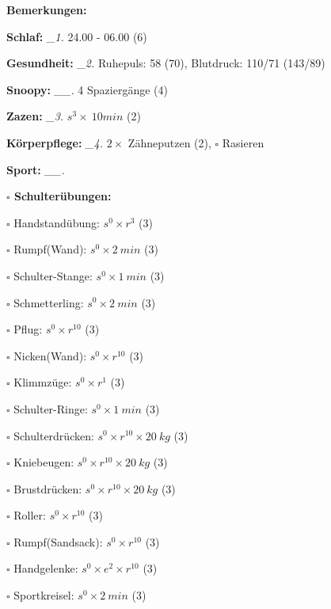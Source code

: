 \documentclass[10pt,a4paper]{article}
\newcommand\prop[1] {{\color {alizarin} {\bf #1}}}             %
\newcommand\mand[1] {{\color {burntorange} {\bf #1}}}          %
\newcommand\topspace{\vskip -15pt \hskip 20pt}
\newcommand\n[1] { {\sl #1.} \hskip 5pt }
\begin{document}
\begin{mdframed}[style=daystyle]
  \begin{labeling}{{\mand {Bemerkungen:}}}
    \setlength\itemsep{-3pt}
  \item[{\mand {Schlaf:}}]        \n{\_1} 24.00 - 06.00 (6)
  \item[{\mand {Gesundheit:}}]    \n{\_2} Ruhepuls: 58 (70), Blutdruck: 110/71 (143/89)
  \item[{\mand {Snoopy:}}]       \n{\_\_} 4 Spaziergänge (4) 
  \item[{\mand {Zazen:}}]         \n{\_3} $s^3 \times\ 10 min$ (2)
  \item[{\mand {Körperpflege:}}]  \n{\_4} $2 \times$ Zähneputzen (2), $\square$ Rasieren
  \item[{\mand {Sport:}}]        \n{\_\_}
    \topspace
    \begin{minipage}{0.75\textwidth}  
      \begin{labeling}{\prop {$\square$ {Schulterübungen:}}} 
        \setlength\itemsep{-3pt}
      \item[$\square$ Handstandübung:]  $s^0 \times r^{3}$ (3)
      \item[$\square$ Rumpf(Wand):]     $s^0 \times 2\ min$ (3)
      \item[$\square$ Schulter-Stange:] $s^0 \times 1\ min$ (3)
      \item[$\square$ Schmetterling:]   $s^0 \times 2\ min$ (3)
      \item[$\square$ Pflug:]           $s^0 \times r^{10}$ (3)
      \item[$\square$ Nicken(Wand):]    $s^0 \times r^{10}$ (3)
      \item[$\square$ Klimmzüge:]       $s^0 \times r^1$ (3)
      \item[$\square$ Schulter-Ringe:]  $s^0 \times 1\ min$ (3)
      \item[$\square$ Schulterdrücken:] $s^0 \times r^{10} \times 20\ kg$ (3)
      \item[$\square$ Kniebeugen:]      $s^0 \times r^{10} \times 20\ kg$ (3)
      \item[$\square$ Brustdrücken:]    $s^0 \times r^{10} \times 20\ kg$ (3)
      \item[$\square$ Roller:]          $s^0 \times r^{10}$ (3)
      \item[$\square$ Rumpf(Sandsack):] $s^0 \times r^{10}$ (3)
      \item[$\square$ Handgelenke:]     $s^0 \times e^2 \times r^{10}$ (3)
      \item[$\square$ Sportkreisel:]    $s^0 \times 2\ min$ (3)

\end{labeling}
\end{minipage}
\end{labeling}
\end{mdframed}
\end{document}

